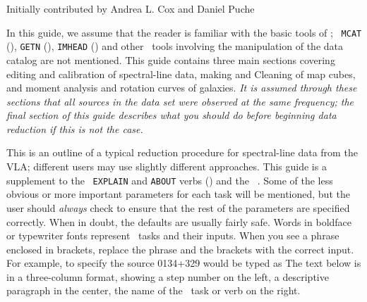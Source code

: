 \centerline{Initially contributed by Andrea L. Cox and Daniel Puche}

In this guide, we assume that the reader is familiar with the basic
tools of \AIPS; \eg\ {\tt MCAT} (), {\tt GETN}
(), {\tt IMHEAD} () and other \AIPS\ tools
involving the manipulation of the data catalog are not mentioned.
This guide contains three main sections covering editing and
calibration of spectral-line data, making and Cleaning of map cubes,
and moment analysis and rotation curves of galaxies.  {\em It is
assumed through these sections that all sources in the data set were
observed at the same frequency; the final section of this guide
describes what you should do before beginning data reduction if this
is not the case.}

This is an outline of a typical reduction procedure for spectral-line
data from the VLA; different users may use slightly different
approaches.  This guide is a supplement to the \AIPS\ {\tt EXPLAIN}
and {\tt ABOUT} verbs () and the \AIPS\ \Cookbook.  Some of
the less obvious or more important parameters for each task will be
mentioned, but the user should {\em always} check to ensure that the
rest of the parameters are specified correctly.  When in doubt, the
defaults are usually fairly safe.  Words in boldface or typewriter
fonts represent \AIPS\ tasks and their inputs.  When you see a phrase
enclosed in brackets, replace the phrase and the brackets with the
correct input.  For example, to specify the source 0134+329
would be typed as
The text below is in a three-column format, showing a step number on
the left, a descriptive paragraph in the center, the name of the
\AIPS\ task or verb on the right.
\pd




